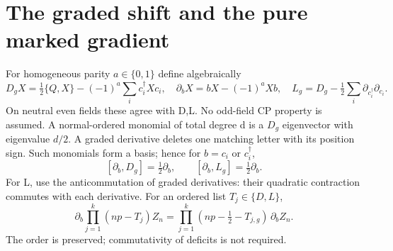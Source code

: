 \documentclass[11pt]{article}
\begin{document}
\section{The graded shift and the pure marked gradient}
For homogeneous parity $a\in\{0,1\}$ define algebraically
\[
 D_gX=\tfrac12\{Q,X\}-(-1)^a\sum_i c_i^\dagger Xc_i,\quad
 \partial_bX=bX-(-1)^aXb,\quad
 L_g=D_g-\tfrac12\sum_i\partial_{c_i^\dagger}\partial_{c_i}.
\]
On neutral even fields these agree with D,L. No odd-field CP
property is assumed. A normal-ordered monomial of total degree d
is a $D_g$ eigenvector with eigenvalue $d/2$. A graded derivative
deletes one matching letter with its position sign. Such monomials
form a basis; hence for $b=c_i$ or $c_i^\dagger$,
\[
 [\partial_b,D_g]=\tfrac12\partial_b,\qquad
 [\partial_b,L_g]=\tfrac12\partial_b. \tag{G}
\]
For L, use the anticommutation of graded derivatives: their
quadratic contraction commutes with each derivative. For an ordered
list $T_j\in\{D,L\}$,
\[
 \partial_b\prod_{j=1}^k(np-T_j)Z_n
 =\prod_{j=1}^k(np-\tfrac12-T_{j,g})\,\partial_bZ_n. \tag{S}
\]
The order is preserved; commutativity of deficits is not required.
\end{document}
